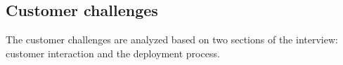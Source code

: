 \documentclass[lnbip]{svmultln}
\begin{document}





\subsection{Customer challenges}
The customer challenges are analyzed based on two sections of the interview: customer interaction and the deployment process.
\end{document}
